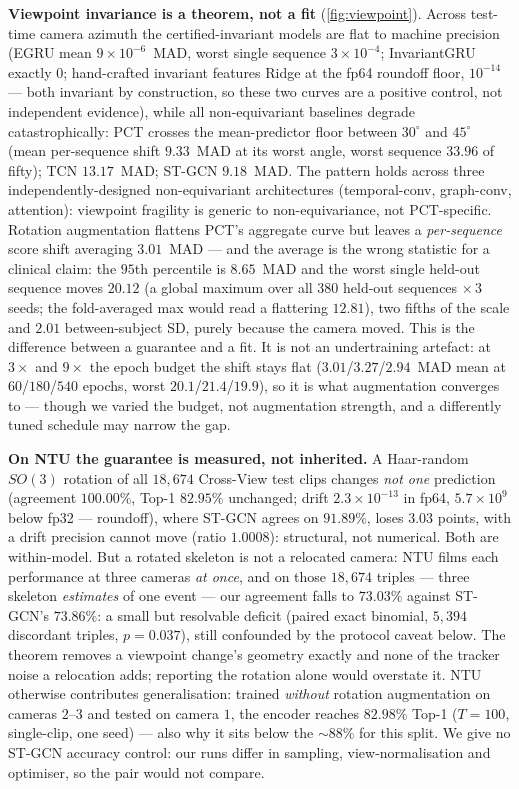 \documentclass[10pt,twocolumn,letterpaper]{article}
\begin{document}
\textbf{Viewpoint invariance is a theorem, not a fit} (\cref{fig:viewpoint}). Across test-time camera
azimuth the certified-invariant models are flat to machine precision (EGRU mean
$9\times10^{-6}$~MAD, worst single sequence $3\times10^{-4}$; InvariantGRU exactly $0$; hand-crafted invariant features Ridge at the fp64
roundoff floor, $10^{-14}$ --- both invariant by construction, so these two curves are a
positive control, not independent evidence),
while all non-equivariant baselines degrade catastrophically: PCT crosses the mean-predictor floor between
$30^\circ$ and $45^\circ$ (mean per-sequence shift $9.33$~MAD at its worst angle, worst sequence
$33.96$ of fifty); TCN $13.17$~MAD; ST-GCN $9.18$~MAD. The pattern holds across three
independently-designed non-equivariant architectures (temporal-conv, graph-conv, attention):
viewpoint fragility is generic to non-equivariance, not PCT-specific. Rotation augmentation flattens PCT's aggregate curve but leaves a \emph{per-sequence}
score shift averaging $3.01$~MAD --- and the average is the wrong statistic for a clinical claim: the
$95$th percentile is $8.65$~MAD and the worst single held-out sequence moves $20.12$ (a global maximum
over all $380$ held-out sequences $\times\,3$ seeds; the fold-averaged max would read a flattering
$12.81$), two fifths of the scale and $2.01$ between-subject SD, purely because the camera moved. This is the difference between a guarantee and a fit. It is not
an undertraining artefact: at $3\times$ and $9\times$ the epoch budget the shift stays flat
($3.01$/$3.27$/$2.94$~MAD mean at $60$/$180$/$540$ epochs, worst $20.1$/$21.4$/$19.9$), so it is what augmentation
converges to --- though we varied the budget, not augmentation strength, and a differently tuned
schedule may narrow the gap.

\textbf{On NTU the guarantee is measured, not inherited.} A Haar-random $SO(3)$ rotation of all
$18{,}674$ Cross-View test clips changes \emph{not one} prediction (agreement $100.00\%$, Top-1
$82.95\%$ unchanged; drift $2.3\times10^{-13}$ in fp64, $5.7\times10^{9}$ below fp32 --- roundoff),
where ST-GCN agrees on $91.89\%$, loses $3.03$ points, with a drift precision cannot move (ratio
$1.0008$): structural, not numerical. Both are within-model. But a rotated skeleton is not a
relocated camera: NTU films each performance at three cameras \emph{at once}, and on those
$18{,}674$ triples --- three skeleton \emph{estimates} of one event --- our agreement falls to
$73.03\%$ against ST-GCN's $73.86\%$: a small but resolvable deficit (paired exact binomial,
$5{,}394$ discordant triples, $p{=}0.037$), still confounded by the protocol caveat below. The
theorem removes a viewpoint change's geometry exactly and none of the tracker noise a relocation
adds; reporting the rotation alone would overstate it.
NTU otherwise contributes generalisation: trained \emph{without} rotation augmentation on cameras
$2$--$3$ and tested on camera $1$, the encoder reaches $82.98\%$ Top-1 ($T{=}100$, single-clip, one
seed) --- also why it sits below the $\sim\!88\%$ for this split. We give no ST-GCN accuracy control:
our runs differ in sampling, view-normalisation and optimiser, so the pair would not compare.
\end{document}
